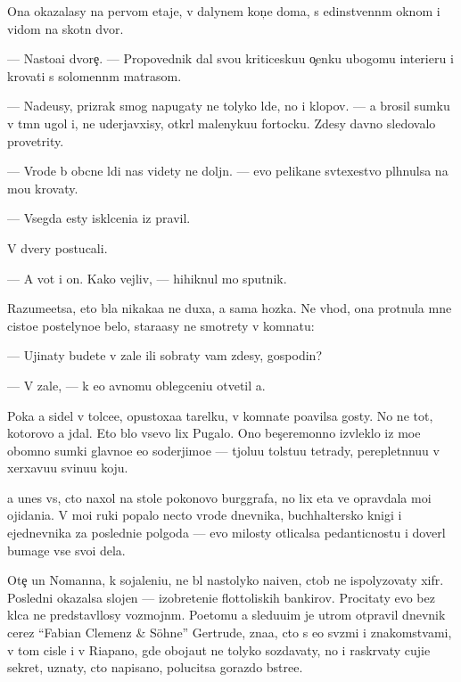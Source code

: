 \documentclass[10pt]{book}
\begin{document}
Ona okazalasy na pervom etaje, v dalynem kon{\c}e doma, s {\y}edinstvenn{\yi}m oknom i vidom na skotn{\yi}{\y} dvor.

— Nasto{\y}a{\x}i{\y} dvore{\c}. — Pro\-po\-ved\-nik dal svo{\y}u kriticesku{\y}u o{\c}enku ubogomu interieru i krovati s solomenn{\yi}m matrasom.

— Nade{\y}usy, prizrak smog napugaty ne tolyko l{\io}de{\y}, no i klopov. — {\Y}a brosil sumku v t{\e}mn{\yi}{\y} ugol i, ne uderjavxisy, otkr{\yi}l malenyku{\y}u fortocku. Zdesy davno sledovalo provetrity.

— Vrode b{\yi} ob{\yi}cn{\yi}{\y}e l{\io}di nas videty ne doljn{\yi}. — {\Y}evo pelikan{\y}e sv{\ia}\-te{\y}\-xestvo pl{\io}hnulsa na mo{\y}u krovaty.

— Vsegda {\y}esty iskl{\io}ceni{\y}a iz pravil.

V dvery postucali.

— A vot i on. Kako{\y} vejliv{\yi}{\y}, — hihiknul mo{\y} sputnik.

Razume{\y}etsa, eto b{\yi}la nikaka{\y}a ne duxa, a sama hoz{\ia}{\y}ka. Ne vhod{\ia}, ona pro\-t{\ia}\-nu\-la mne cisto{\y}e postelyno{\y}e bel{\y}o, stara{\y}asy ne smotrety v komnatu:

— Ujinaty budete v zale ili sobraty vam zdesy, gospodin?

— V zale, — k {\y}e{\y}o {\y}avnomu oblegceni{\y}u otvetil {\y}a.

Poka {\y}a sidel v tolce{\y}e, opustoxa{\y}a tarelku, v komnate po{\y}avilsa gosty. No ne tot, kotorovo {\y}a jdal. Eto b{\yi}lo vsevo lix Pugalo. Ono bes{\c}eremonno izvleklo iz mo{\y}e{\y} ob{\y}omno{\y} sumki glavno{\y}e {\y}e{\y}o soderjimo{\y}e — t{\ia}jolu{\y}u tolstu{\y}u tetrady, pereplet{\e}nnu{\y}u v xerxavu{\y}u svinu{\y}u koju.

{\Y}a unes vs{\e}, cto naxol na stole poko{\y}novo burggrafa, no lix eta ve{\x} opravdala mo{\y}i ojidani{\y}a. V mo{\y}i ruki popalo necto vrode dnevnika, buchhaltersko{\y} knigi i {\y}ejednevnika za posledni{\y}e polgoda — {\y}evo milosty otlicalsa pedanticnost{\y}u i dover{\ia}l bumage vse svo{\y}i dela.

Ote{\c} un Nomanna, k sojaleni{\y}u, ne b{\yi}l nastolyko naiven, ctob{\yi} ne ispolyzovaty xifr. Posledni{\y} okazalsa slojen — izobreteni{\y}e flottoli{\y}skih bankirov. Procitaty {\y}evo bez kl{\io}ca ne predstavl{\ia}losy vozmojn{\yi}m. Poetomu {\y}a sledu{\y}u{\x}im je utrom otpravil dnevnik cerez ``Fabian Clemenz \& Söhne'' Gertrude, zna{\y}a, cto s {\y}e{\y}o sv{\ia}\-z{\ia}\-mi i znakomstvami, v tom cisle i v Riapano, gde oboja{\y}ut ne tolyko sozdavaty, no i raskr{\yi}vaty cuji{\y}e sekret{\yi}, uznaty, cto napisano, polucitsa gorazdo b{\yi}stre{\y}e.
\end{document}
